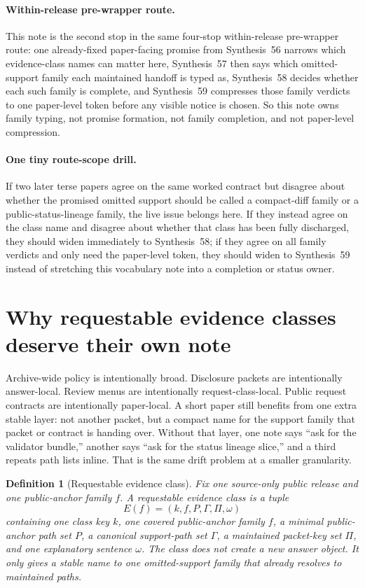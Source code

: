 \documentclass[11pt]{article}
\newtheorem{definition}{Definition}
\begin{document}
\paragraph{Within-release pre-wrapper route.}
This note is the second stop in the same four-stop within-release pre-wrapper route: one already-fixed paper-facing promise from Synthesis~56 narrows which evidence-class names can matter here, Synthesis~57 then says which omitted-support family each maintained handoff is typed as, Synthesis~58 decides whether each such family is complete, and Synthesis~59 compresses those family verdicts to one paper-level token before any visible notice is chosen. So this note owns family typing, not promise formation, not family completion, and not paper-level compression.\cite{series:publicrequestcontracts,series:requestfulfillmentcertificates,series:publicrequeststatusenvelopes}

\paragraph{One tiny route-scope drill.}
If two later terse papers agree on the same worked contract but disagree about whether the promised omitted support should be called a compact-diff family or a public-status-lineage family, the live issue belongs here. If they instead agree on the class name and disagree about whether that class has been fully discharged, they should widen immediately to Synthesis~58; if they agree on all family verdicts and only need the paper-level token, they should widen to Synthesis~59 instead of stretching this vocabulary note into a completion or status owner.\cite{series:workedexample}

\section{Why requestable evidence classes deserve their own note}
Archive-wide policy is intentionally broad.
Disclosure packets are intentionally answer-local.
Review menus are intentionally request-class-local.
Public request contracts are intentionally paper-local.
A short paper still benefits from one extra stable layer: not another packet, but a compact name for the support family that packet or contract is handing over.
Without that layer, one note says ``ask for the validator bundle,'' another says ``ask for the status lineage slice,'' and a third repeats path lists inline.
That is the same drift problem at a smaller granularity.

\begin{definition}[Requestable evidence class]
Fix one source-only public release and one public-anchor family $f$.
A \emph{requestable evidence class} is a tuple
\[
E(f)=(k,f,P,\Gamma,\Pi,\omega)
\]
containing one class key $k$, one covered public-anchor family $f$, a minimal public-anchor path set $P$, a canonical support-path set $\Gamma$, a maintained packet-key set $\Pi$, and one explanatory sentence $\omega$.
The class does not create a new answer object.
It only gives a stable name to one omitted-support family that already resolves to maintained paths.
\end{definition}
\end{document}
